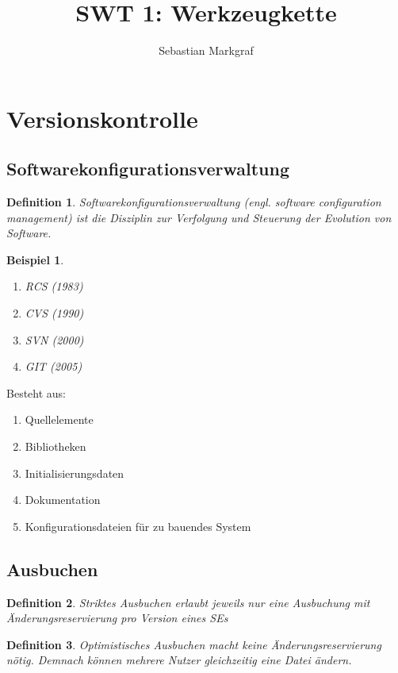 \documentclass[a4paper]{article}
\title{SWT 1: Werkzeugkette}
\author{Sebastian Markgraf}
\theoremstyle{break}
\newtheorem{defi}{Definition}[section]
\newtheorem{ex}{Beispiel}[section]
\begin{document}
    \maketitle
    \newpage

    \section{Versionskontrolle}
    \subsection{Softwarekonfigurationsverwaltung}
    \begin{defi}
      Softwarekonfigurationsverwaltung (engl. software configuration management) ist die Disziplin zur Verfolgung und Steuerung der Evolution von Software.
    \end{defi}

    \begin{ex}
      \begin {enumerate}
        \item RCS (1983)
        \item CVS (1990)
        \item SVN (2000)
        \item GIT (2005)
      \end {enumerate}
    \end{ex}
    
    Besteht aus:
    \begin{enumerate}
    \item Quellelemente
    \item Bibliotheken
    \item Initialisierungsdaten
    \item Dokumentation
    \item Konfigurationsdateien für zu bauendes System  
    \end{enumerate}

    \subsection{Ausbuchen}
    \begin {defi}
      Striktes Ausbuchen erlaubt jeweils nur eine Ausbuchung mit Änderungsreservierung pro Version eines SEs
    \end {defi}

    \begin {defi}
      Optimistisches Ausbuchen macht keine Änderungsreservierung nötig. Demnach können mehrere Nutzer gleichzeitig eine Datei ändern.
    \end {defi}
\end{document}
